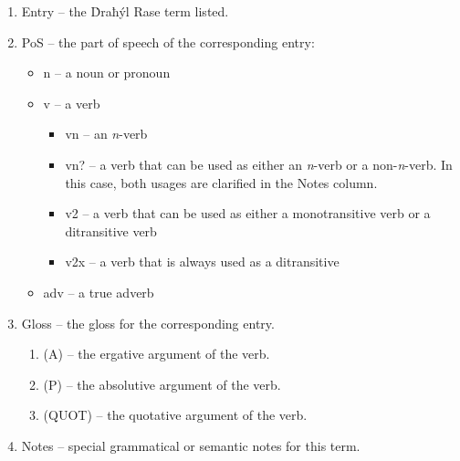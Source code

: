 \documentclass{book}
\begin{document}
\begin{enumerate}
    \item \textsf{Entry} -- the Ḋraħýl Rase term listed.
    \item \textsf{PoS} -- the part of speech of the corresponding entry:
    \begin{itemize}
        \item \textsf{n} -- a noun or pronoun
        \item \textsf{v} -- a verb
        \begin{itemize}
            \item \textsf{vn} -- an \emph{n}-verb
            \item \textsf{vn?} -- a verb that can be used as either an \emph{n}-verb or a non-\emph{n}-verb. In this case, both usages are clarified in the \textsf{Notes} column.
            \item \textsf{v2} -- a verb that can be used as either a monotransitive verb or a ditransitive verb
            \item \textsf{v2x} -- a verb that is always used as a ditransitive
        \end{itemize}
        \item \textsf{adv} -- a true adverb
    \end{itemize}
    \item \textsf{Gloss} -- the gloss for the corresponding entry.
    \begin{enumerate}
        \item \textsf{(A)} -- the ergative argument of the verb.
        \item \textsf{(P)} -- the absolutive argument of the verb.
        \item \textsf{(QUOT)} -- the quotative argument of the verb.
    \end{enumerate}
    \item \textsf{Notes} -- special grammatical or semantic notes for this term.
\end{enumerate}

\begin{multicols}{2}
    
\end{multicols}
\end{document}

